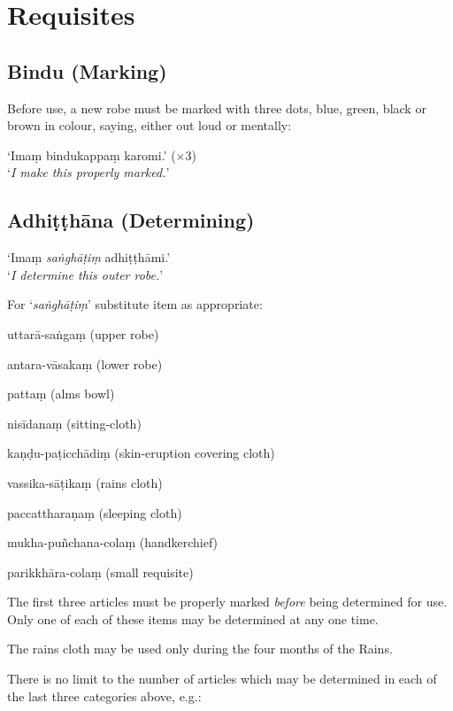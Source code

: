 \chapter{Requisites}

\section{Bindu (Marking)}

Before use, a new robe must be marked with three dots, \mbox{blue,} \mbox{green,} black or
brown in colour, saying, either out loud or mentally:

‘Imaṃ bindukappaṃ karomi.’ (×3)\\
‘\emph{I make this properly marked.}’ 

\section{Adhiṭṭhāna (Determining)}
\label{determine-robe}

‘Imaṃ \emph{saṅghāṭiṃ} adhiṭṭhāmi.’\\
‘\emph{I determine this outer robe.}’

For ‘\emph{saṅghāṭiṃ}’ substitute item as appropriate:

\begin{packeditemize}

\item uttarā-saṅgaṃ (upper robe)
\item antara-vāsakaṃ (lower robe)
\item pattaṃ (alms bowl)
\item nisīdanaṃ (sitting-cloth)
\item kaṇḍu-paṭicchādiṃ (skin-eruption covering cloth)
\item vassika-sāṭikaṃ (rains cloth)
\item paccattharaṇaṃ (sleeping cloth)
\item mukha-puñchana-colaṃ (handkerchief)
\item parikkhāra-colaṃ (small requisite)

\end{packeditemize}

The first three articles must be properly marked \emph{before} being determined
for use. Only one of each of these items may be determined at any one time.

The rains cloth may be used only during the four months of the Rains.

There is no limit to the number of articles which may be determined in each of
the last three categories above, e.g.:

